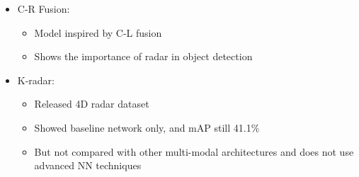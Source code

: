 \documentclass[rnd]{mas_proposal}
\begin{document}
\begin{itemize}

    \item C-R Fusion:
    \cite{Nobis2020May}
    \begin{itemize}
        \item Model inspired by C-L fusion
        \item Shows the importance of radar in object detection
    \end{itemize}
    
    \item K-radar: 
    \cite{Paek2022Jun}
    \begin{itemize}
        \item Released 4D radar dataset
        \item Showed baseline network only, and mAP still 41.1\%
        \item But not compared with other multi-modal architectures and does not use advanced NN techniques 
    \end{itemize}
    


\end{itemize}
\end{document}
